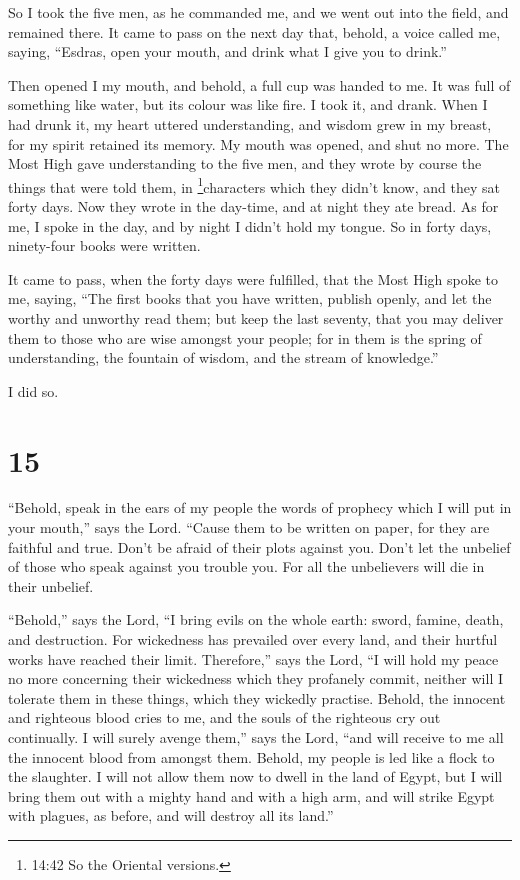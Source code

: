  So I took the five men, as he commanded me, and we went
out into the field, and remained there.  It came to pass on
the next day that, behold, a voice called me, saying, ``Esdras, open
your mouth, and drink what I give you to drink.''

 Then opened I my mouth, and behold, a full cup was handed
to me. It was full of something like water, but its colour was like
fire.  I took it, and drank. When I had drunk it, my heart
uttered understanding, and wisdom grew in my breast, for my spirit
retained its memory.  My mouth was opened, and shut no
more.  The Most High gave understanding to the five men,
and they wrote by course the things that were told them, in
\footnote{14:42 So the Oriental versions.}characters which they didn't
know, and they sat forty days. Now they wrote in the day-time, and at
night they ate bread.  As for me, I spoke in the day, and
by night I didn't hold my tongue.  So in forty days,
ninety-four books were written.

 It came to pass, when the forty days were fulfilled, that
the Most High spoke to me, saying, ``The first books that you have
written, publish openly, and let the worthy and unworthy read them;
 but keep the last seventy, that you may deliver them to
those who are wise amongst your people;  for in them is the
spring of understanding, the fountain of wisdom, and the stream of
knowledge.''

 I did so.

\hypertarget{section-14}{%
\section{15}\label{section-14}}

 ``Behold, speak in the ears of my people the words of
prophecy which I will put in your mouth,'' says the Lord. 
``Cause them to be written on paper, for they are faithful and true.
 Don't be afraid of their plots against you. Don't let the
unbelief of those who speak against you trouble you.  For
all the unbelievers will die in their unbelief.

 ``Behold,'' says the Lord, ``I bring evils on the whole
earth: sword, famine, death, and destruction.  For
wickedness has prevailed over every land, and their hurtful works have
reached their limit.  Therefore,'' says the Lord,
 ``I will hold my peace no more concerning their wickedness
which they profanely commit, neither will I tolerate them in these
things, which they wickedly practise. Behold, the innocent and righteous
blood cries to me, and the souls of the righteous cry out continually.
 I will surely avenge them,'' says the Lord, ``and will
receive to me all the innocent blood from amongst them. 
Behold, my people is led like a flock to the slaughter. I will not allow
them now to dwell in the land of Egypt,  but I will bring
them out with a mighty hand and with a high arm, and will strike Egypt
with plagues, as before, and will destroy all its land.''

